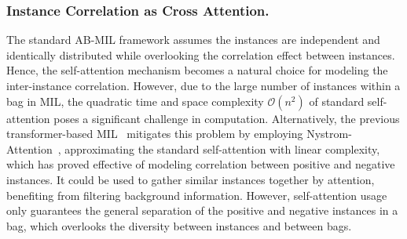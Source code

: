 \documentclass[runningheads]{llncs}
\begin{document}
\subsubsection{Instance Correlation as Cross Attention.} The standard AB-MIL framework assumes the instances are independent and identically distributed while overlooking the correlation effect between instances. Hence, the self-attention mechanism becomes a natural choice for modeling the inter-instance correlation. However, due to the large number of instances within a bag in MIL, the quadratic time and space complexity $\mathcal{O}(n^2)$ of standard self-attention poses a significant challenge in computation. Alternatively, the previous transformer-based MIL~\cite{shao2021transmil} mitigates this problem by employing Nystrom-Attention~\cite{xiong2021nystromformer}, approximating the standard self-attention with linear complexity, which has proved effective of modeling correlation between positive and negative instances. It could be used to gather similar instances together by attention, benefiting from filtering background information. However, self-attention usage only guarantees the general separation of the positive and negative instances in a bag, which overlooks the diversity between instances and between bags. 
\end{document}

